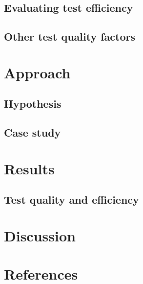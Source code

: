 \documentclass[a4paper]{report}
\begin{document}
  \section{Evaluating test efficiency}
    \label{sec:efficiency}
    


  \section{Other test quality factors}
    \label{sec:quality}
    


\chapter{Approach}

  

  \section{Hypothesis}
  \label{sec:hypothesis}
  

  \section{Case study}
  


\chapter{Results}
\label{chap:results}

  

  \section{Test quality and efficiency}
  


\chapter{Discussion}
\label{chap:discussion}

  

  

\newpage

\chapter*{References}
\begin{multicols}{2}
    \small
    \renewcommand{\bibsection}{ \vspace{-\baselineskip}\vspace{-1.1mm} }
    
    
\end{multicols}
\end{document}
